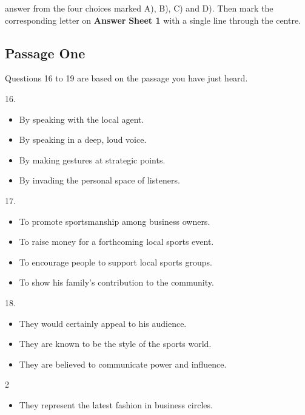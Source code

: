 \documentclass[UTF8,11pt]{ctexart}
\begin{document}
answer from the four choices marked A), B), C) and D). Then mark the corresponding letter on\textbf{ Answer} \textbf{Sheet 1} with a single line through the centre.


\subsection*{Passage One}


Questions 16 to 19 are based on the passage you have just heard.


16.


\begin{itemize}[leftmargin=2em,itemsep=.2em,topsep=.4em]\item[A.] By speaking with the local agent.
\item[B.] By speaking in a deep, loud voice.
\item[C.] By making gestures at strategic points.
\item[D.] By invading the personal space of listeners.
\end{itemize}

17.


\begin{itemize}[leftmargin=2em,itemsep=.2em,topsep=.4em]\item[A.] To promote sportsmanship among business owners.
\item[B.] To raise money for a forthcoming local sports event.
\item[C.] To encourage people to support local sports groups.
\item[D.] To show his family’s contribution to the community.
\end{itemize}

18.


\begin{itemize}[leftmargin=2em,itemsep=.2em,topsep=.4em]\item[A.] They would certainly appeal to his audience.
\item[B.] They are known to be the style of the sports world.
\item[C.] They are believed to communicate power and influence.
\end{itemize}

2


\begin{itemize}[leftmargin=2em,itemsep=.2em,topsep=.4em]\item[D.] They represent the latest fashion in business circles.
\end{itemize}
\end{document}
